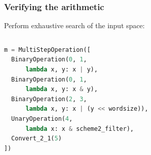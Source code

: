 \documentclass[11pt,t,usepdftitle=false,aspectratio=169]{beamer}
\begin{document}
\begin{frame}[fragile]
  \frametitle{Verifying the arithmetic}
  Perform exhaustive search of the input space:
  \begin{columns}[T]
    \begin{column}{0.48\textwidth}
      \begin{lstlisting}[language=python,basicstyle=\small]
m = MultiStepOperation([
  BinaryOperation(0, 1,
      lambda x, y: x | y),
  BinaryOperation(0, 1,
      lambda x, y: x & y),
  BinaryOperation(2, 3,
      lambda x, y: x | (y << wordsize)),
  UnaryOperation(4,
      lambda x: x & scheme2_filter),
  Convert_2_1(5)
])
      \end{lstlisting}
    \end{column}
    \hfill
  \end{columns}
\end{frame}

\end{document}
